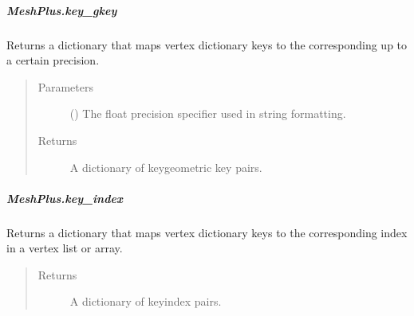 \documentclass[letterpaper,10pt,english]{sphinxmanual}
\begin{document}
\begin{fulllineitems}
\begin{fulllineitems}
\end{fulllineitems}



\subparagraph{MeshPlus.key\_gkey}
\label{\detokenize{api/generated/directional_clustering.mesh.MeshPlus.key_gkey:meshplus-key-gkey}}\label{\detokenize{api/generated/directional_clustering.mesh.MeshPlus.key_gkey::doc}}

\begin{fulllineitems}
\label{\detokenize{api/generated/directional_clustering.mesh.MeshPlus.key_gkey:directional_clustering.mesh.MeshPlus.key_gkey}}
Returns a dictionary that maps vertex dictionary keys to the corresponding
 up to a certain precision.
\begin{quote}\begin{description}
\item[{Parameters}] \leavevmode
{} () \textendash{} The float precision specifier used in string formatting.

\item[{Returns}] \leavevmode
{} \textendash{} A dictionary of key\sphinxhyphen{}geometric key pairs.

\end{description}\end{quote}

\end{fulllineitems}



\subparagraph{MeshPlus.key\_index}
\label{\detokenize{api/generated/directional_clustering.mesh.MeshPlus.key_index:meshplus-key-index}}\label{\detokenize{api/generated/directional_clustering.mesh.MeshPlus.key_index::doc}}

\begin{fulllineitems}
\label{\detokenize{api/generated/directional_clustering.mesh.MeshPlus.key_index:directional_clustering.mesh.MeshPlus.key_index}}
Returns a dictionary that maps vertex dictionary keys to the
corresponding index in a vertex list or array.
\begin{quote}\begin{description}
\item[{Returns}] \leavevmode
{} \textendash{} A dictionary of key\sphinxhyphen{}index pairs.


\end{description}
\end{quote}
\end{fulllineitems}
\end{fulllineitems}
\end{document}
